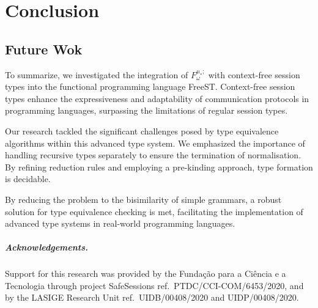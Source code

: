 
\chapter{Conclusion}

\section{Future Wok}




To summarize, we investigated the integration of  $F^{\mu_*;}_\omega$ with context-free session types into the functional programming language FreeST. Context-free session types enhance the expressiveness and adaptability of communication protocols in programming languages, surpassing the limitations of regular session types. 

Our research tackled the significant challenges posed by type equivalence algorithms within this advanced type system. We emphasized the importance of handling recursive types separately to ensure the termination of normalisation. By refining reduction rules and employing a pre-kinding approach, type formation is decidable.

By reducing the problem to the bisimilarity of simple grammars, a robust solution for type equivalence checking is met, facilitating the implementation of advanced type systems in real-world programming languages.
\medskip

\paragraph{Acknowledgements.}
  Support for this research was provided by the Fundação para a Ciência e a
  Tecnologia through project SafeSessions ref.\ PTDC/CCI-COM/6453/2020, and by the
  LASIGE Research Unit ref.\ UIDB/00408/2020
  and UIDP/00408/2020.
